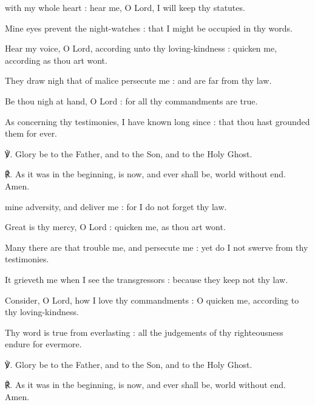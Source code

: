 \begin{multicols}{2}
 with my whole heart : hear me, O Lord, I will keep thy statutes.\par
{}
Mine eyes prevent the night-watches : that I might be occupied in thy words.\par
{}Hear my voice, O Lord, according unto thy loving-kindness : quicken me, according as thou art wont.\par
{}They draw nigh that of malice persecute me : and are far from thy law.\par
{}Be thou nigh at hand, O Lord : for all thy commandments are true.\par
{}As concerning thy testimonies, I have known long since : that thou hast grounded them for ever.\par
℣. Glory be to the Father, and to the Son, and to the Holy Ghost.\par
℟. As it was in the beginning, is now, and ever shall be, world without end. Amen.

 mine adversity, and deliver me : for I do not forget thy law.\par
{}
Great is thy mercy, O Lord : quicken me, as thou art wont.\par
{}Many there are that trouble me, and persecute me : yet do I not swerve from thy testimonies.\par
{}It grieveth me when I see the transgressors : because they keep not thy law.\par
{}Consider, O Lord, how I love thy commandments : O quicken me, according to thy loving-kindness.\par
{}Thy word is true from everlasting : all the judgements of thy righteousness endure for evermore.\par
℣. Glory be to the Father, and to the Son, and to the Holy Ghost.\par
℟. As it was in the beginning, is now, and ever shall be, world without end. Amen.


\end{multicols}
